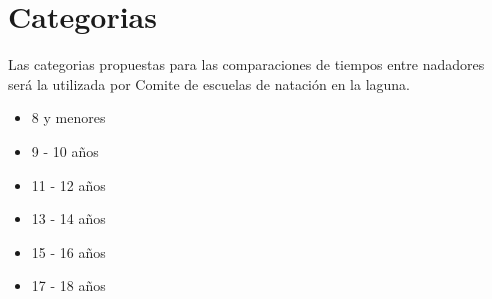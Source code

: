 \section{Categorias}
Las categorias propuestas para las comparaciones de tiempos entre nadadores será la utilizada por Comite de escuelas de natación en la laguna.
\begin{multicols}{2}
    \begin{center}
        \begin{itemize}
            \item 8 y menores
            \item 9 - 10 años
            \item 11 - 12 años
            \item 13 - 14 años
            \item 15 - 16 años
            \item 17 - 18 años
        \end{itemize}
    \end{center}
\end{multicols}